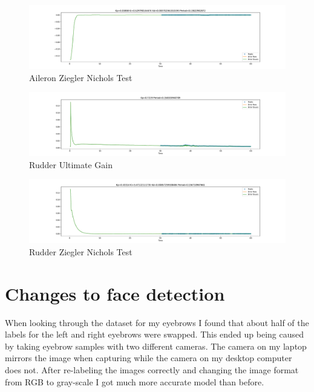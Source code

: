 \documentclass[11pt]{scrartcl} %
\begin{document}
\begin{figure}[ht!] %
	\centering
	\includegraphics[trim={5cm 0 5cm 0},clip,width=\textwidth]{figures/aeleronZiglerNichols.pdf} 
	\caption{Aileron Ziegler Nichols Test}
\end{figure}


\begin{figure}[ht!] %
	\centering
	\includegraphics[trim={5cm 0 5cm 0},clip,width=\textwidth]{figures/rudderTestGain.pdf} 
	\caption{Rudder Ultimate Gain}
\end{figure}

\begin{figure}[ht!] %
	\centering
	\includegraphics[trim={5cm 0 5cm 0},clip,width=\textwidth]{figures/rudderZiglerNichols.pdf} 
	\caption{Rudder Ziegler Nichols Test}
\end{figure}

\clearpage
\section{Changes to face detection}

When looking through the dataset for my eyebrows I found that about half of the labels for the left and right eyebrows were swapped. This ended up being caused by taking eyebrow samples with two different cameras. The camera on my laptop mirrors the image when capturing while the camera on my desktop computer does not. After re-labeling the images correctly and changing the image format from RGB to gray-scale I got much more accurate model than before.
\end{document}
